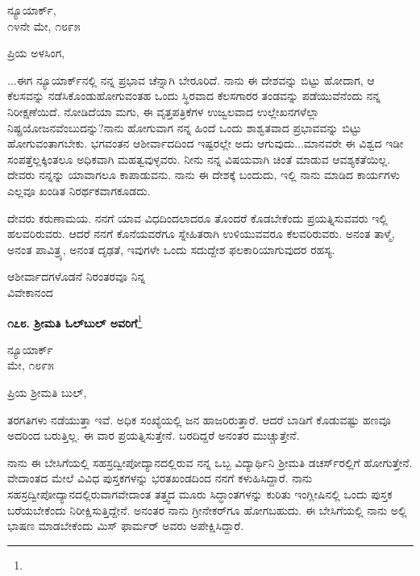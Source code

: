 \begin{flushright}
ನ್ಯೂಯಾರ್ಕ್,\\೧೪ನೇ ಮೇ, ೧೮೯೫
\end{flushright}

\vspace{-0.3cm}

\noindent
ಪ್ರಿಯ ಅಳಸಿಂಗ,

...ಈಗ ನ್ಯೂಯಾರ್ಕ್‌ನಲ್ಲಿ ನನ್ನ ಪ್ರಭಾವ ಚೆನ್ನಾಗಿ ಬೇರೂರಿದೆ. ನಾನು ಈ ದೇಶವನ್ನು ಬಿಟ್ಟು ಹೋದಾಗ, ಆ ಕೆಲಸವನ್ನು ನಡೆಸಿಕೊಂಡುಹೋಗುವಂತಹ ಒಂದು ಸ್ಥಿರವಾದ ಕೆಲಸಗಾರರ ತಂಡವನ್ನು ಪಡೆಯುವೆನೆಂದು ನನ್ನ ನಿರೀಕ್ಷಣೆಯಿದೆ. ನೋಡಿದೆಯಾ ಮಗು, ಈ ವೃತ್ತಪತ್ರಿಕೆಗಳ ಉಜ್ವಲವಾದ ಉಲ್ಲೇಖನಗಳೆಲ್ಲಾ ನಿಷ್ಪ್ರಯೋಜನವೆಂಬುದನ್ನು?ನಾನು ಹೋಗುವಾಗ ನನ್ನ ಹಿಂದೆ ಒಂದು ಶಾಶ್ವತವಾದ ಪ್ರಭಾವವನ್ನು ಬಿಟ್ಟು ಹೋಗುವಂತಾಗಬೇಕು. ಭಗವಂತನ ಆಶೀರ್ವಾದದಿಂದ ಇಷ್ಟರಲ್ಲೇ ಅದು ಆಗುವುದು...ಮಾನವರೇ ಈ ವಿಶ್ವದ ಇಡೀ ಸಂಪತ್ತೆಲ್ಲಕ್ಕಿಂತಲೂ ಅಧಿಕವಾಗಿ ಮಹತ್ವವುಳ್ಳವರು. ನೀನು ನನ್ನ ವಿಷಯವಾಗಿ ಚಿಂತೆ ಮಾಡುವ ಆವಶ್ಯಕತೆಯಿಲ್ಲ. ದೇವರು ನನ್ನನ್ನು ಯಾವಾಗಲೂ ಕಾಪಾಡುವನು. ನಾನು ಈ ದೇಶಕ್ಕೆ ಬಂದುದು, ಇಲ್ಲಿ ನಾನು ಮಾಡಿದ ಕಾರ್ಯಗಳು ಎಲ್ಲವೂ ಖಂಡಿತ ನಿರರ್ಥಕವಾಗಕೂಡದು.

ದೇವರು ಕರುಣಾಮಯ. ನನಗೆ ಯಾವ ವಿಧದಿಂದಲಾದರೂ ತೊಂದರೆ ಕೊಡಬೇಕೆಂದು ಪ್ರಯತ್ನಿಸುವವರು ಇಲ್ಲಿ ಹಲವರಿರುವರು. ಆದರೆ ನನಗೆ ಕೊನೆಯವರೆಗೂ ಸ್ನೇಹಿತರಾಗಿ ಉಳಿಯುವವರೂ ಕೆಲವರಿರುವರು. ಅನಂತ ತಾಳ್ಮೆ, ಅನಂತ ಪಾವಿತ್ರ್ಯ, ಅನಂತ ದೃಢತೆ, ಇವುಗಳೇ ಒಂದು ಸದುದ್ದೇಶ ಫಲಕಾರಿಯಾಗುವುದರ ರಹಸ್ಯ.

\vspace{-0.2cm}

{\flushright
ಆಶೀರ್ವಾದಗಳೊಡನೆ ನಿರಂತರವೂ ನಿನ್ನ\\ವಿವೇಕಾನಂದ\par}

\begin{center}
\textbf{೧೭೮. ಶ‍್ರೀಮತಿ ಓಲ್‌ಬುಲ್‌ ಅವರಿಗೆ}\footnote{}
\end{center}

\vspace{-0.7cm}

\begin{flushright}
ನ್ಯೂಯಾರ್ಕ್\\ಮೇ, ೧೮೯೫
\end{flushright}

\vspace{-0.5cm}

\noindent
ಪ್ರಿಯ ಶ‍್ರೀಮತಿ ಬುಲ್,

ತರಗತಿಗಳು ನಡೆಯುತ್ತಾ ಇವೆ. ಅಧಿಕ ಸಂಖ್ಯೆಯಲ್ಲಿ ಜನ ಹಾಜರಿರುತ್ತಾರೆ. ಆದರೆ ಬಾಡಿಗೆ ಕೊಡುವಷ್ಟು ಹಣವೂ ಅದರಿಂದ ಬರುತ್ತಿಲ್ಲ. ಈ ವಾರ ಪ್ರಯತ್ನಿಸುತ್ತೇನೆ. ಬರದಿದ್ದರೆ ಅನಂತರ ಮುಚ್ಚುತ್ತೇನೆ.

ನಾನು ಈ ಬೇಸಿಗೆಯಲ್ಲಿ ಸಹಸ್ರದ್ವೀಪೋದ್ಯಾನದಲ್ಲಿರುವ ನನ್ನ ಒಬ್ಬ ವಿದ್ಯಾರ್ಥಿನಿ ಶ‍್ರೀಮತಿ ಡಚರ್ಸ್‌ರಲ್ಲಿಗೆ ಹೋಗುತ್ತೇನೆ. ವೇದಾಂತದ ಮೇಲೆ ವಿವಿಧ ಪುಸ್ತಕಗಳನ್ನು ಭರತಖಂಡದಿಂದ ನನಗೆ ಕಳುಹಿಸಿದ್ದಾರೆ. ನಾನು ಸಹಸ್ರದ್ವೀಪೋದ್ಯಾನದಲ್ಲಿರುವಾಗ\break ವೇದಾಂತ ತತ್ತ್ವದ ಮೂರು ಸಿದ್ಧಾಂತಗಳನ್ನು ಕುರಿತು ಇಂಗ್ಲೀಷಿನಲ್ಲಿ ಒಂದು ಪುಸ್ತಕ ಬರೆಯಬೇಕೆಂದು ನಿರೀಕ್ಷಿಸುತ್ತಿದ್ದೇನೆ. ಅನಂತರ ನಾನು ಗ್ರೀನೇಕರ್‌ಗೂ ಹೋಗಬಹುದು. ಈ ಬೇಸಿಗೆಯಲ್ಲಿ ನಾನು ಅಲ್ಲಿ ಭಾಷಣ ಮಾಡಬೇಕೆಂದು ಮಿಸ್ ಫಾರ್ಮರ್ ಅವರು ಅಪೇಕ್ಷಿಸಿದ್ದಾರೆ.

